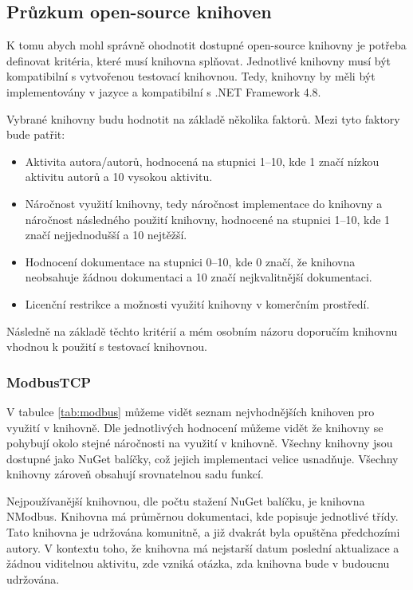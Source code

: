 \subsection{Průzkum open-source knihoven}
K tomu abych mohl správně ohodnotit dostupné open-source knihovny je potřeba definovat kritéria, které musí knihovna splňovat. Jednotlivé knihovny musí být kompatibilní s vytvořenou testovací knihovnou. Tedy, knihovny by měli být implementovány v jazyce \csharp{} a kompatibilní s .NET Framework 4.8. 

Vybrané knihovny budu hodnotit na základě několika faktorů. Mezi tyto faktory bude patřit:

\begin{itemize}
    \item Aktivita autora/autorů, hodnocená na stupnici 1--10, kde 1 značí nízkou aktivitu autorů a 10 vysokou aktivitu.
    \item Náročnost využití knihovny, tedy náročnost implementace do knihovny a náročnost následného použití knihovny, hodnocené na stupnici 1--10, kde 1 značí nejjednodušší a 10 nejtěžší.
    \item Hodnocení dokumentace na stupnici 0--10, kde 0 značí, že knihovna neobsahuje žádnou dokumentaci a 10 značí nejkvalitnější dokumentaci.
    \item Licenční restrikce a možnosti využití knihovny v komerčním prostředí.
\end{itemize}

Následně na základě těchto kritérií a mém osobním názoru doporučím knihovnu vhodnou k použití s testovací knihovnou. 

\subsubsection{ModbusTCP}

V tabulce \ref{tab:modbus} můžeme vidět seznam nejvhodnějších knihoven pro využití v knihovně. Dle jednotlivých hodnocení můžeme vidět že knihovny se pohybují okolo stejné náročnosti na využití v knihovně. Všechny knihovny jsou dostupné jako NuGet balíčky, což jejich implementaci velice usnadňuje. Všechny knihovny zároveň obsahují srovnatelnou sadu funkcí.

Nejpoužívanější knihovnou, dle počtu stažení NuGet balíčku, je knihovna NModbus. Knihovna má průměrnou dokumentaci, kde popisuje jednotlivé třídy. Tato knihovna je udržována komunitně, a již dvakrát byla opuštěna předchozími autory. V kontextu toho, že knihovna má nejstarší datum poslední aktualizace a žádnou viditelnou aktivitu, zde vzniká otázka, zda knihovna bude v budoucnu udržována.


